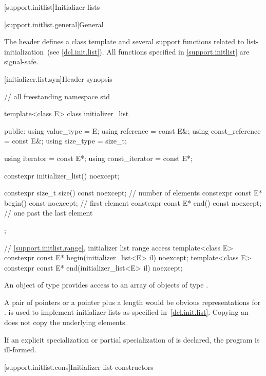 [support.initlist]{Initializer lists}

[support.initlist.general]{General}

\pnum
The header  defines a class template and several
support functions related to list-initialization~(see \ref{dcl.init.list}).
%
All functions specified in \ref{support.initlist} are signal-safe.

[initializer.list.syn]{Header  synopsis}
%
%
%

\begin{codeblock}
// all freestanding
namespace std {
  template<class E> class initializer_list {
  public:
    using value_type      = E;
    using reference       = const E&;
    using const_reference = const E&;
    using size_type       = size_t;

    using iterator        = const E*;
    using const_iterator  = const E*;

    constexpr initializer_list() noexcept;

    constexpr size_t size() const noexcept;     // number of elements
    constexpr const E* begin() const noexcept;  // first element
    constexpr const E* end() const noexcept;    // one past the last element
  };

  // \ref{support.initlist.range}, initializer list range access
  template<class E> constexpr const E* begin(initializer_list<E> il) noexcept;
  template<class E> constexpr const E* end(initializer_list<E> il) noexcept;
}
\end{codeblock}

\pnum
An object of type  provides access to an array of
objects of type .
\begin{note}
A pair of pointers or a pointer plus
a length would be obvious representations for .
 is used to implement initializer lists as specified
in~\ref{dcl.init.list}. Copying an  does not copy the underlying
elements.
\end{note}

\pnum
If an explicit specialization or partial specialization of
 is declared, the program is ill-formed.

[support.initlist.cons]{Initializer list constructors}

